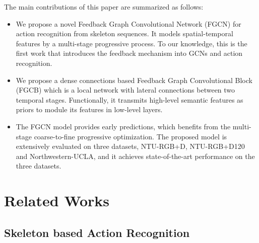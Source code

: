 \documentclass[runningheads]{llncs}
\begin{document}
The main contributions of this paper are summarized as follows:
\vspace{-1mm}
\begin{itemize}
	\item We propose a novel Feedback Graph Convolutional Network (FGCN) for action recognition from skeleton sequences. It models spatial-temporal features by a multi-stage progressive process. To our knowledge, this is the first work that introduces the feedback mechanism into GCNs and action recognition.
	\vspace{1mm}
	\item We propose a dense connections based Feedback Graph Convolutional Block (FGCB) which is a local network with lateral connections between two temporal stages. Functionally, it transmits high-level semantic features as priors to module its features in low-level layers.
	\vspace{1mm}
	\item The FGCN model provides early predictions, which benefits from the multi-stage coarse-to-fine progressive optimization. The proposed model is extensively evaluated on three datasets, NTU-RGB+D, NTU-RGB+D120 and Northwestern-UCLA, and it achieves state-of-the-art performance on the three datasets.
\end{itemize}

\vspace{-2mm}
\section{Related Works}
\vspace{-1mm}
\subsection{Skeleton based Action Recognition}
\end{document}
